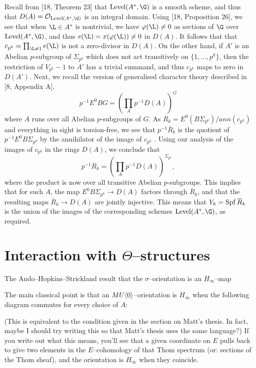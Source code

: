 Recall from [18, Theorem 23] that $\Level(A^*,\G)$ is a smooth scheme, and thus that $D(A) = \sheaf O_{\Level(A^*,\G)}$ is an integral domain. Using [18, Proposition 26], we see that when $\L \in A^*$ is nontrivial, we have $\phi(\L) \ne 0$ as sections of $\G$ over $\Level(A^*, \G)$, and thus $e(\L) = x(\phi(\L)) \ne 0$ in $D(A)$. It follows that that $c_{p^k} = \prod_{\L \ne 1} e(\L)$ is not a zero-divisor in $D(A)$. On the other hand, if $A'$ is an Abelian $p$-subgroup of $\Sigma_{p^k}$ which does not act transitively on $\{1, \ldots, p^k\}$, then the restriction of $V_{p^k} − 1$ to $A'$ has a trivial summand, and thus $c_{p^k}$ maps to zero in $D(A')$. Next, we recall the version of generalised character theory described in [8, Appendix A].
\[p^{-1} E^0 BG = \left(\prod_A p^{-1} D(A)\right)^G\]
where $A$ runs over all Abelian $p$-subgroups of $G$. As $\overline R_k = E^0(B\Sigma_{p^k} )/ ann(c_{p^k} )$ and everything in sight is torsion-free, we see that $p^{−1} \overline R_k$ is the quotient of $p^{−1}E^0B\Sigma_{p^k}$ by the annihilator of the image of $c_{p^k}$ . Using our analysis of the images of $c_{p^k}$ in the rings $D(A)$, we conclude that
\[p^{-1} \overline R_k = \left(\prod_A p^{−1}D(A)\right)^{\Sigma_{p^k}},\]
where the product is now over all transitive Abelian $p$-subgroups. This implies that for such $A$, the map $E^0B\Sigma_{p^k} \to D(A)$ factors through $\overline R_k$, and that the resulting maps $\overline R_k \to D(A)$ are jointly injective. This means that $Y_k = \operatorname{Spf} \overline R_k$ is the union of the images of the corresponding schemes $\Level(A^*,\G)$, as required.








\section{Interaction with \texorpdfstring{$\Theta$}{Theta}--structures}

The Ando--Hopkins--Strickland result that the $\sigma$--orientation is an $H_\infty$--map

The main classical point is that an $MU\langle0\rangle$--orientation is $H_\infty$ when the following diagram commutes for every choice of $A$:
\begin{center}
\end{center}
(This is equivalent to the condition given in the section on Matt's thesis.  In fact, maybe I should try writing this so that Matt's thesis uses the same language?)  If you write out what this means, you'll see that a given coordinate on $E$ pulls back to give two elements in the $E$--cohomology of that Thom spectrum (or: sections of the Thom sheaf), and the orientation is $H_\infty$ when they coincide.

